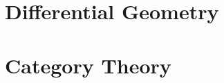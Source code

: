 \documentclass{book}
\newcommand{\parttoc}{}
\theoremstyle{definition}
\theoremstyle{definition}
\numberwithin{asy}{chapter}
\begin{document}
\part{Differential Geometry}
\label{part:diffgeo}
\parttoc






% 
% 

\part{Category Theory}
\label{part:cats}
\parttoc


\end{document}
